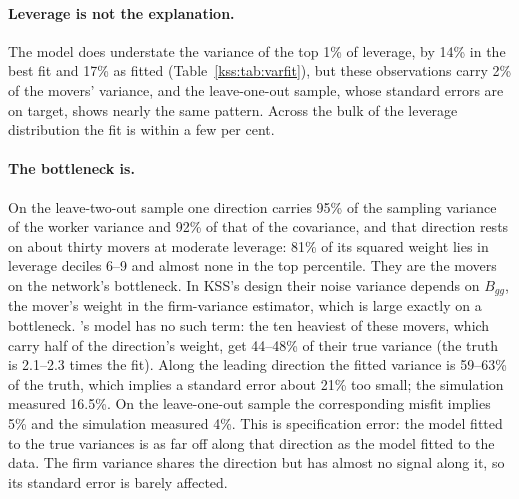 \paragraph{Leverage is not the explanation.} The model does understate the variance of the top 1\% of leverage,
by 14\% in the best fit and 17\% as fitted (Table~\ref{kss:tab:varfit}), but these observations carry 2\% of the
movers' variance, and the leave-one-out sample, whose standard errors are on target, shows nearly the same
pattern. Across the bulk of the leverage distribution the fit is within a few per cent.

\paragraph{The bottleneck is.} On the leave-two-out sample one direction carries 95\% of the sampling variance of
the worker variance and 92\% of that of the covariance, and that direction rests on about thirty movers at
moderate leverage: 81\% of its squared weight lies in leverage deciles 6--9 and almost none in the top
percentile. They are the movers on the network's bottleneck. In KSS's design their noise variance depends on
$B_{gg}$, the mover's weight in the firm-variance estimator, which is large exactly on a bottleneck. \fevc's
model has no such term: the ten heaviest of these movers, which carry half of the direction's weight, get 44--48\%
of their true variance (the truth is 2.1--2.3 times the fit). Along the leading direction the fitted
variance is 59--63\% of the truth, which implies a standard error about 21\% too small; the simulation measured
16.5\%. On the leave-one-out sample the corresponding misfit implies 5\% and the simulation measured 4\%. This is
specification error: the model fitted to the true variances is as far off along that direction as the model
fitted to the data. The firm variance shares the direction but has almost no signal along it, so its standard
error is barely affected.

